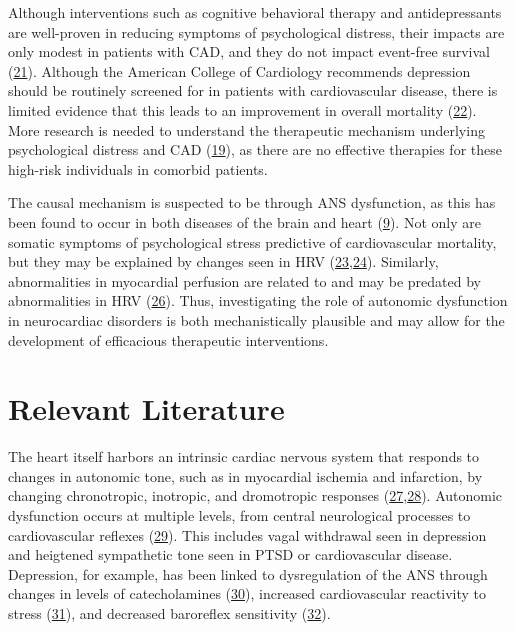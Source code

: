 \documentclass[
  11pt,
  openany]{book}
\begin{document}
Although interventions such as cognitive behavioral therapy and antidepressants are well-proven in reducing symptoms of psychological distress, their impacts are only modest in patients with CAD, and they do not impact event-free survival (\protect\hyperlink{ref-Berkman2003}{21}).
Although the American College of Cardiology recommends depression should be routinely screened for in patients with cardiovascular disease, there is limited evidence that this leads to an improvement in overall mortality (\protect\hyperlink{ref-Kronish2019}{22}).
More research is needed to understand the therapeutic mechanism underlying psychological distress and CAD (\protect\hyperlink{ref-Carney2017}{19}), as there are no effective therapies for these high-risk individuals in comorbid patients.

The causal mechanism is suspected to be through ANS dysfunction, as this has been found to occur in both diseases of the brain and heart (\protect\hyperlink{ref-Davis1993}{9}).
Not only are somatic symptoms of psychological stress predictive of cardiovascular mortality, but they may be explained by changes seen in HRV (\protect\hyperlink{ref-Smolderen2017}{23},\protect\hyperlink{ref-Shah2021a}{24}).
Similarly, abnormalities in myocardial perfusion are related to and may be predated by abnormalities in HRV (\protect\hyperlink{ref-Shah2020}{26}).
Thus, investigating the role of autonomic dysfunction in neurocardiac disorders is both mechanistically plausible and may allow for the development of efficacious therapeutic interventions.

\hypertarget{relevant-literature}{%
\chapter{Relevant Literature}\label{relevant-literature}}

The heart itself harbors an intrinsic cardiac nervous system that responds to changes in autonomic tone, such as in myocardial ischemia and infarction, by changing chronotropic, inotropic, and dromotropic responses (\protect\hyperlink{ref-Armour1999}{27},\protect\hyperlink{ref-Zipes1990}{28}).
Autonomic dysfunction occurs at multiple levels, from central neurological processes to cardiovascular reflexes (\protect\hyperlink{ref-Abboud2011}{29}).
This includes vagal withdrawal seen in depression and heigtened sympathetic tone seen in PTSD or cardiovascular disease.
Depression, for example, has been linked to dysregulation of the ANS through changes in levels of catecholamines (\protect\hyperlink{ref-Veith1994b}{30}), increased cardiovascular reactivity to stress (\protect\hyperlink{ref-Hughes2008}{31}), and decreased baroreflex sensitivity (\protect\hyperlink{ref-Davydov2007}{32}).
\end{document}
